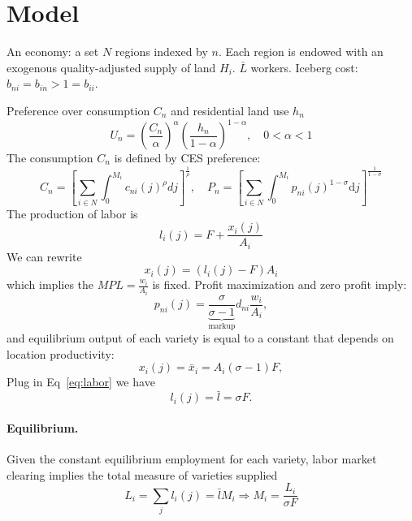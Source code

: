 \documentclass[11pt,a4paper]{article}
\begin{document}
\section{Model}
An economy: a set $N$ regions indexed by $n$. Each region is endowed with an exogenous quality-adjusted supply of land $H_i$. $\bar{L}$ workers. Iceberg cost: $b_{ni} = b_{in}>1= b_{ii}$. 

Preference over consumption $C_n$ and residential land use $h_n$
\begin{equation}
    U_n = \left( \frac{C_n}{\alpha } \right)^{\alpha } \left( \frac{h_n}{1-\alpha } \right)^{1-\alpha },\quad 0<\alpha <1
\end{equation}
The consumption $C_n$ is defined by CES preference:
\begin{equation}
    C_n = \left[ \sum_{i \in N} \int_{0}^{M_i} c_{ni}(j)^\rho d j\right]^{\frac{1}{\rho}},\quad P_n = \left[ \sum_{i \in N} \int_{0}^{M_i} p_{ni}(j)^{1-\sigma } \mathrm{d} j\right]^{\frac{1}{1-\sigma}}\label{eq:pn}
\end{equation}
The production of labor is 
\begin{equation}
  l_i (j ) = F + \frac{x_i(j)}{A_i}\label{eq:labor}
\end{equation}
We can rewrite $$ x_i(j) = (l_i(j)-F)A_i $$ which implies the $MPL = \frac{w_i}{A_i}$ is fixed. 
Profit maximization and zero profit imply: 
\begin{equation}
  p_{ni}(j) = \underbrace{\frac{\sigma }{\sigma -1}}_{\text{markup}} d_{ni} \frac{w_i}{A_i},\label{eq:pnij}
\end{equation}
and equilibrium output of each variety is equal to a constant that depends on location productivity:
\begin{equation}
  x_i (j) = \bar{x}_i = A_i (\sigma -1) F,
\end{equation}
Plug in Eq~\eqref{eq:labor} we have
\begin{equation}
  l_i (j ) =  \bar{l} = \sigma F.
\end{equation}
\paragraph{Equilibrium.} Given the constant equilibrium employment for each variety, labor market clearing implies the total measure of varieties supplied
\begin{equation}
  L_i = \sum_{j}^{} l_i (j) = \bar{l} M_i \Rightarrow M_i = \frac{L_i}{\sigma F}\label{eq:li}
\end{equation}
\end{document}
